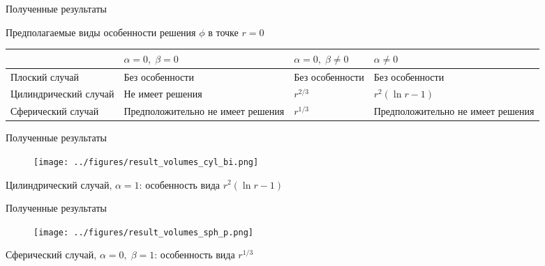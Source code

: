 \documentclass[aspectratio=169]{beamer}
\begin{document}
\begin{frame}{Полученные результаты}
\vspace{-1cm}
\begin{center}
	Предполагаемые виды особенности решения $\phi$ в точке $r = 0$
\end{center}
\begin{tabular}{|m{3cm}||m{3.5cm}|m{3.5cm}|m{3.5cm}|}
	\hline
	\vspace*{2mm} \hfill \vspace*{2mm} &\centering $\alpha = 0, \; \beta = 0$ &
	\centering $\alpha = 0, \; \beta \neq 0$ & \centering \arraybackslash $\alpha \neq 0$ \\
	\hline
	\hline
	\vspace{2mm} Плоский \linebreak случай \vspace{2mm} &
	Без особенности & Без особенности & Без особенности \\
	\hline
	\vspace{2mm} Цилиндрический \linebreak случай \vspace{2mm} &
	Не имеет решения & $r^{2/3}$ & $r^2 (\ln r - 1)$ \\
	\hline
	\vspace{2mm} Сферический \linebreak случай \vspace{2mm} &
	Предположительно не имеет решения & $r^{1/3}$ & Предположительно
	не имеет решения \\
	\hline
\end{tabular}
\end{frame}


\begin{frame}{Полученные результаты}
\vspace{-0.6cm}
\begin{figure}
	\texttt{[image: ../figures/result\_volumes\_cyl\_bi.png]}
\end{figure}
\vspace{-0.7cm}
\begin{center}
	Цилиндрический случай, $\alpha = 1$: особенность вида $r^2 (\ln r - 1)$
\end{center}
\end{frame}


\begin{frame}{Полученные результаты}
\vspace{-0.6cm}
\begin{figure}
	\texttt{[image: ../figures/result\_volumes\_sph\_p.png]}
\end{figure}
\vspace{-0.7cm}
\begin{center}
	Сферический случай, $\alpha = 0, \; \beta = 1$: особенность вида $r^{1/3}$
\end{center}
\end{frame}
\end{document}
